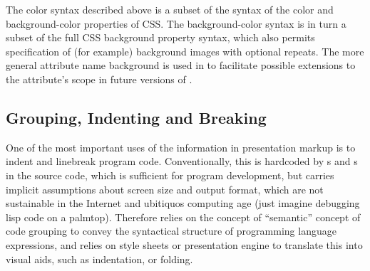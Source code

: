 The color syntax described above is a subset of the syntax of the color and
background-color properties of CSS. The background-color syntax is in turn a
subset of the full CSS background property syntax, which also permits
specification of (for example) background images with optional repeats. The more
general attribute name background is used in {\codeml} to facilitate possible
extensions to the attribute's scope in future versions of {\codeml}.

\subsection{Grouping, Indenting and Breaking}\label{sec:pres:grouping}

One of the most important {\codeml} uses of the information in presentation
{\codeml} markup is to indent and linebreak
program code. Conventionally, this is hardcoded by {s} and
{s} in the source code, which is sufficient for program
development, but carries implicit assumptions about screen size and output format,
which are not sustainable in the Internet and ubitiquos computing age (just
imagine debugging lisp code on a palmtop). Therefore {\codeml} relies on the
concept of ``semantic'' concept of code grouping to convey the syntactical
structure of programming language expressions, and relies on style sheets or
presentation engine to translate this into visual aids, such as indentation, or
folding. 

